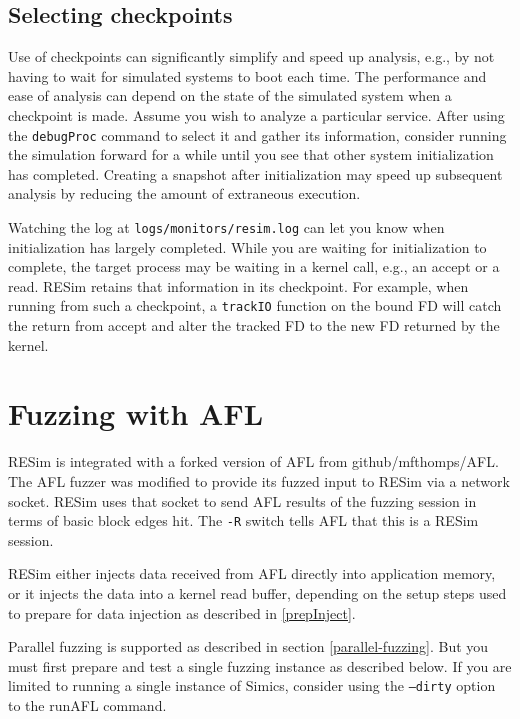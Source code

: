 \documentclass[titlepage]{article}
\begin{document}
\subsection{Selecting checkpoints}
Use of checkpoints can significantly simplify and speed up analysis, e.g., by not having to wait for simulated systems to boot each time.
The performance and ease of analysis can depend on the state of the simulated system when a checkpoint is made.  Assume you wish to analyze 
a particular service. After using the {\tt debugProc} command to select it and gather its information, consider running the simulation
forward for a while until you see that other system initialization has completed.  Creating a snapshot after initialization may speed up
subsequent analysis by reducing the amount of extraneous execution.  

Watching the log at {\tt logs/monitors/resim.log} can let you know when initialization has largely completed.
While you are waiting for initialization to complete, the target process may be waiting in a kernel call, e.g., an accept or a read.
RESim retains that information in its checkpoint.  For example, when running from such a checkpoint, a {\tt trackIO} function on the bound FD 
will catch the return from accept and alter the tracked FD to the new FD returned by the kernel.

\section{Fuzzing with AFL}
\label{fuzz}
RESim is integrated with a forked version of AFL from github/mfthomps/AFL.
The AFL fuzzer was modified to provide its fuzzed input to RESim via a
network socket.  RESim uses that socket to send AFL results of the fuzzing
session in terms of basic block edges hit.  The {\tt -R} switch tells AFL
that this is a RESim session.

RESim either injects data received from AFL directly into application memory, or it injects the data into
a kernel read buffer, depending on the setup steps used to prepare for data injection as described in \ref{prepInject}.

Parallel fuzzing is supported as described in section \ref{parallel-fuzzing}.  But you must first prepare and
test a single fuzzing instance as described below.  If you are limited to running a single instance of Simics, consider using
the {\tt --dirty} option to the runAFL command.
\end{document}
